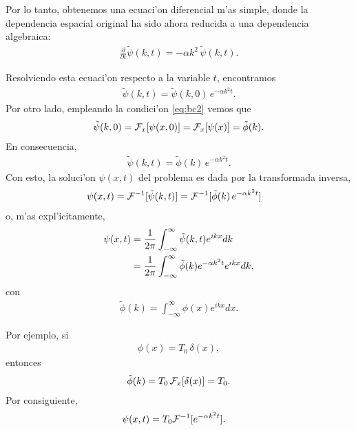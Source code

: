 Por lo tanto, obtenemos una ecuaci'on diferencial m'as simple, donde la dependencia espacial original ha sido ahora reducida a una dependencia algebraica:
\begin{align}
\frac{\partial}{\partial t}\tilde{\psi}(k,t)=-\alpha k^2\, \tilde{\psi}(k,t).
\end{align}

Resolviendo esta ecuaci'on respecto a la variable $t$, encontramos
\begin{align}
\tilde{\psi}(k,t)=\tilde{\psi}(k,0)\,e^{-\alpha k^2 t}.
\end{align}
Por otro lado, empleando la condici'on \eqref{eq:bc2} vemos que
\begin{align}
\tilde{\psi}(k,0) = {\cal F}_{x}[\psi(x,0)]={\cal F}_{x}[\psi(x)] =\tilde{\phi}(k).
\end{align}
En consecuencia,
\begin{align}
\tilde{\psi}(k,t)=\tilde{\phi}(k)\,e^{-\alpha k^2 t}.
\end{align}
Con esto, la soluci'on $\psi(x,t)$ del problema es dada por la transformada inversa,
\begin{align}
\psi(x,t) &= {\cal F}^{-1}[\tilde{\psi}(k,t)]= {\cal F}^{-1}[\tilde{\phi}(k)\,e^{-\alpha k^2 t}]
\end{align}
o, m'as expl'icitamente,
\begin{align}
\psi(x,t) &= \frac{1}{2\pi}\int_{-\infty}^{\infty}\tilde{\psi}(k,t)e^{ikx} dk\notag \\
&= \frac{1}{2\pi}\int_{-\infty}^{\infty}\tilde{\phi}(k)e^{-\alpha k^2 t}e^{ikx} dk,
\end{align}
con
\begin{align}
\tilde{\phi}(k)=\int_{-\infty}^{\infty}\phi(x)e^{ikx}dx.
\end{align}

Por ejemplo, si
\begin{align}
\phi(x)=T_{0}\,\delta(x),
\end{align}
entonces
\begin{align}
\tilde{\phi}(k)=T_{0}\,{\cal F}_{x}[\delta(x)]=T_{0}.
\end{align}
Por consiguiente,
\begin{align}
\psi(x,t) &= T_{0}{\cal F}^{-1}[e^{-\alpha k^2 t}].
\end{align}

